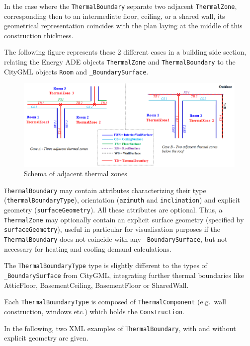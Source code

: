 \documentclass[a4paper,12pt]{article}
\begin{document}
In the case where the \lstinline!ThermalBoundary! separate two adjacent
\lstinline!ThermalZone!, corresponding then to an intermediate floor,
ceiling, or a shared wall, its geometrical representation coincides with
the plan laying at the middle of this construction thickness.

The following figure represents these 2 different cases in a building
side section, relating the Energy ADE objects \lstinline!ThermalZone!
and \lstinline!ThermalBoundary! to the CityGML objects \lstinline!Room!
and \lstinline!_BoundarySurface!.

\begin{figure}[htbp]
\centering
\includegraphics{fig/ThermalZoneAdjacency.png}
\caption{Schema of adjacent thermal zones}
\end{figure}

\lstinline!ThermalBoundary! may contain attributes characterizing their
type\\
(\lstinline!thermalBoundaryType!), orientation (\lstinline!azimuth! and
\lstinline!inclination!) and explicit geometry
(\lstinline!surfaceGeometry!). All these attributes are optional. Thus,
a \lstinline!ThermalZone! may optionally contain an explicit surface
geometry (specified by \lstinline!surfaceGeometry!), useful in
particular for visualisation purposes if the \lstinline!ThermalBoundary!
does not coincide with any \lstinline!_BoundarySurface!, but not
necessary for heating and cooling demand calculations.

The \lstinline!ThermalBoundaryType! type is slightly different to the
types of \lstinline!_BoundarySurface! from CityGML, integrating further
thermal boundaries like AtticFloor, BasementCeiling, BasementFloor or
SharedWall.

Each \lstinline!ThermalBoundaryType! is composed of
\lstinline!ThermalComponent! (e.g.~wall construction, windows etc.)
which holds the \lstinline!Construction!.

In the following, two XML examples of \lstinline!ThermalBoundary!, with
and without explicit geometry are given.
\end{document}
